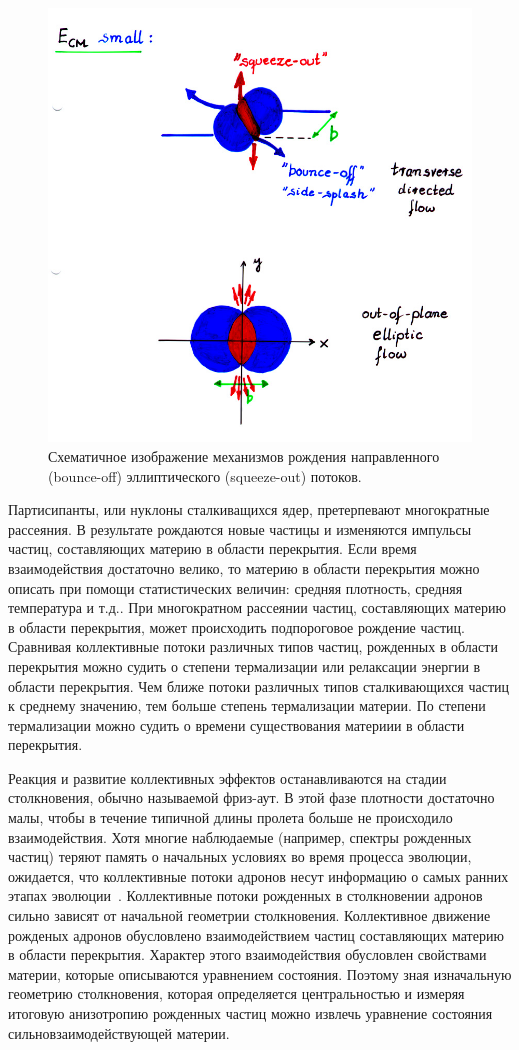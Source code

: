 \begin{figure}[ht]
\begin{center}
    \includegraphics[width=0.75\linewidth]{images/bounce_off.jpg}
    \caption{Схематичное изображение механизмов рождения направленного (bounce-off) эллиптического (squeeze-out) потоков.}
    \label{fig:bounce_off}
\end{center}
\end{figure}
%

Партисипанты, или нуклоны сталкиващихся ядер, претерпевают многократные рассеяния.
В результате рождаются новые частицы и изменяются импульсы частиц, составляющих материю в области перекрытия.
Если время взаимодействия достаточно велико, то материю в области перекрытия можно описать при помощи статистических величин: средняя плотность, средняя температура и т.д..
При многократном рассеянии частиц, составляющих материю в области перекрытия, может происходить подпороговое рождение частиц.
Сравнивая коллективные потоки различных типов частиц, рожденных в области перекрытия можно судить о степени термализации или релаксации энергии в области перекрытия.
Чем ближе потоки различных типов сталкивающихся частиц к среднему значению, тем больше степень термализации материи.
По степени термализации можно судить о времени существования материии в области перекрытия.  

Реакция и развитие коллективных эффектов останавливаются на стадии столкновения, обычно называемой фриз-аут. 
В этой фазе плотности достаточно малы, чтобы в течение типичной длины пролета больше не происходило взаимодействия.
Хотя многие наблюдаемые (например, спектры рожденных частиц) теряют память о начальных условиях во время процесса эволюции, ожидается, что коллективные потоки адронов несут информацию о самых ранних этапах эволюции~\cite{Herrmann:1999wu}.
Коллективные потоки рожденных в столкновении адронов сильно зависят от начальной геометрии столкновения.
Коллективное движение рожденых адронов обусловлено взаимодействием частиц составляющих материю в области перекрытия.
Характер этого взаимодействия обусловлен свойствами материи, которые описываются уравнением состояния.
Поэтому зная изначальную геометрию столкновения, которая определяется центральностью и измеряя итоговую анизотропию рожденных частиц можно извлечь уравнение состояния сильновзаимодействующей материи.

